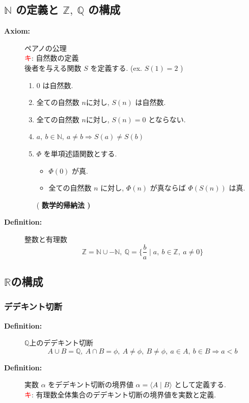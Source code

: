 \documentclass[english,dvipdfmx]{jsarticle}
\newcommand{\average}[1]{\ensuremath{\langle#1\rangle} }
\newcommand*{\point}{\textcircled{\textcolor{red}{\scriptsize キ}}}
\begin{document}
    \subsection{$\mathbb{N}$ の定義と $\mathbb{Z},\ \mathbb{Q}$ の構成}
    \begin{description}
        \item[\bf{Axiom:}] ペアノの公理 \\
        \point : 自然数の定義 \\
        後者を与える関数 $S$ を定義する. (ex. $S(1) = 2$ )
        \begin{enumerate}
            \item $0$ は自然数.
            \item 全ての自然数 $n$に対し, $S(n)$ は自然数.
            \item 全ての自然数 $n$に対し, $S(n) = 0$ とならない.
            \item $a,\ b \in \mathbb{N},\ a \neq b \Rightarrow S(a) \neq S(b)$
            \item $\Phi$ を単項述語関数とする.
                \begin{itemize}
                    \item $\Phi(0)$ が真.
                    \item 全ての自然数 $n$ に対し, $\Phi(n)$ が真ならば $\Phi(S(n))$ は真.
                \end{itemize}
                ( \bf{数学的帰納法} )
        \end{enumerate}
        \item[\bf{Definition:}] 整数と有理数
            \begin{equation*}  
            \mathbb{Z} = \mathbb{N} \cup -\mathbb{N} ,\ \mathbb{Q} = \{ \frac{b}{a} \mid a,\ b \in \mathbb{Z},\ a \neq 0 \}
            \end{equation*}
    \end{description}
    \subsection{$\mathbb{R}$の構成}
    \subsubsection{デデキント切断}
    \begin{description}
    \item[\bf{Definition:}] $\mathbb{Q}$上のデデキント切断
        \begin{equation*}
            A \cup B = \mathbb{Q},\ A \cap B = \phi,\ A \neq \phi,\ B \neq \phi,\ a \in A,\ b \in B \Rightarrow a < b
        \end{equation*}
    \item[\bf{Definition:}] 実数 $\alpha$ をデデキント切断の境界値 $\alpha = \average{A \mid B}$ として定義する. \\
        \point : 有理数全体集合のデデキント切断の境界値を実数と定義.
    \end{description}
\end{document}
